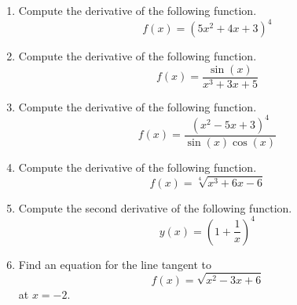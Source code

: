 \documentclass{article}
\begin{document}
\ActivityTitle[class=Calculus I, number=4, name=Differentiation II (Solutions)]

\begin{enumerate}
\item Compute the derivative of the following function. \[ f(x) = (5 x^2 + 4 x + 3)^{4} \]

  
\vspace{1cm}

\item Compute the derivative of the following function. \[ f(x) = \frac{\sin(x)}{x^3 + 3 x + 5} \]

  
\vspace{1cm}

\item Compute the derivative of the following function. \[ f(x) = \frac{(x^2 - 5 x + 3)^{4}}{\sin(x)\cos(x)} \]

  
\vspace{1cm}

\item Compute the derivative of the following function. \[ f(x) = \sqrt[4]{x^3 + 6 x - 6} \]

  
\vspace{1cm}

\item Compute the second derivative of the following function. \[ y(x) = \left( 1 + \frac{1}{x} \right)^{4} \]

  
\vspace{1cm}

\item Find an equation for the line tangent to \[ f(x) = \sqrt{x^2 - 3 x + 6} \] at $x = -2$.

  
\vspace{1cm}
\end{enumerate}
\end{document}
